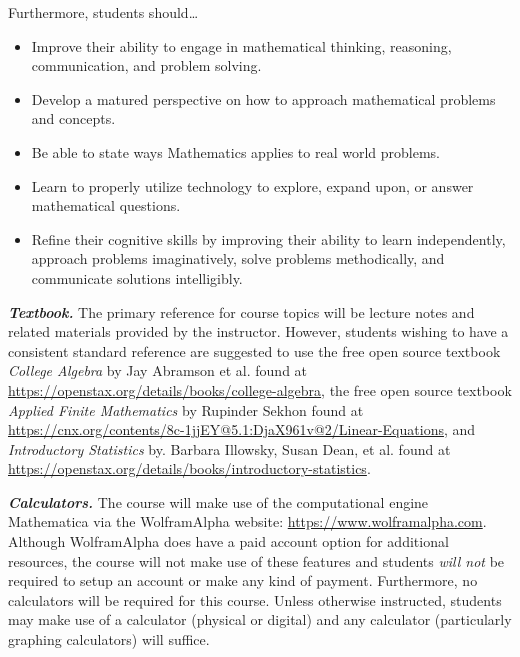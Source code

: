 \documentclass[11pt,letterpaper]{article}
\begin{document}
Furthermore, students should\dots
	\begin{itemize} \itemsep=0.3ex
	\item  Improve their ability to engage in mathematical thinking, reasoning, communication, and problem solving.
	\item Develop a matured perspective on how to approach mathematical problems and concepts.
	\item Be able to state ways Mathematics applies to real world problems.
	\item Learn to properly utilize technology to explore, expand upon, or answer mathematical questions.
	\item Refine their cognitive skills by improving their ability to learn independently, approach problems imaginatively, solve problems methodically, and communicate solutions intelligibly.
	\end{itemize}
\sectionbreak



{\itshape\bfseries\color{stacred}Textbook.} The primary reference for course topics will be lecture notes and related materials provided by the instructor. However, students wishing to have a consistent standard reference are suggested to use the free open source textbook \textit{College Algebra} by Jay Abramson et al. found at \url{https://openstax.org/details/books/college-algebra}, the free open source textbook \textit{Applied Finite Mathematics} by Rupinder Sekhon found at \url{https://cnx.org/contents/8c-1jjEY@5.1:DjaX961v@2/Linear-Equations}, and \textit{Introductory Statistics} by. Barbara Illowsky, Susan Dean, et al. found at \href{https://openstax.org/details/books/introductory-statistics}{https://openstax.org/details/books/introductory-statistics}. \pspace

{\itshape\bfseries\color{stacred}Calculators.} The course will make use of the computational engine Mathematica via the WolframAlpha website: \url{https://www.wolframalpha.com}. Although WolframAlpha does have a paid account option for additional resources, the course will not make use of these features and students {\itshape will not} be required to setup an account or make any kind of payment. Furthermore, no calculators will be required for this course. Unless otherwise instructed, students may make use of a calculator (physical or digital) and any calculator (particularly graphing calculators) will suffice. 
\sectionbreak
\end{document}
